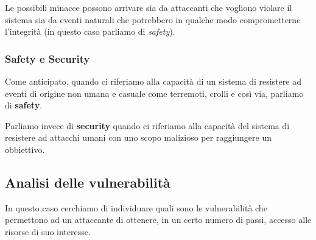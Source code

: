Le possibili minacce possono arrivare sia da attaccanti che vogliono violare il sistema sia da eventi naturali che
potrebbero in qualche modo comprometterne l'integrità (in questo caso parliamo di \emph{safety}).

\subsubsection{Safety e Security}
Come anticipato, quando ci riferiamo alla capacità di un sistema di resistere ad eventi di origine non umana e casuale
come terremoti, crolli e così via, parliamo di \textbf{safety}.

Parliamo invece di \textbf{security} quando ci riferiamo alla capacità del sistema di resistere ad attacchi umani con
uno scopo malizioso per raggiungere un obbiettivo.

\subsection{Analisi delle vulnerabilità}
In questo caso cerchiamo di individuare quali sono le vulnerabilità che permettono ad un attaccante di ottenere, in un 
certo numero di passi, accesso alle risorse di suo interesse.